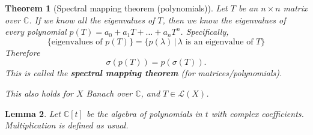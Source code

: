 \documentclass[justified]{tufte-book}
\theoremstyle{plain}%
\newtheorem{thm}{Theorem}[chapter]
\newtheorem{lem}[thm]{Lemma}
\theoremstyle{definition}
\theoremstyle{remark}
\newcommand{\given}{ \, | \,}
\renewcommand{\C}{\mathbb{C}}
\begin{document}
\begin{thm}[Spectral mapping theorem (polynomials)]
  Let $T$ be an $n \times n$ matrix over $\C$.  If we know all the eigenvalues of $T$, then we know the eigenvalues of every polynomial $p(T) = a_0 + a_1 T + \dots + a_n T^n$.  Specifically, \[
      \{ \text{eigenvalues of $p(T)$} \} = \{ p(\lambda) \given \text{$\lambda$ is an eigenvalue of $T$} \}
  \] Therefore \[
      \sigma(p(T)) = p(\sigma(T)).
  \]  This is called the \textbf{spectral mapping theorem} (for matrices/polynomials). 
  
  This also holds for $X$ Banach over $\C$, and $T \in \mathcal L(X)$.
\end{thm}

\begin{lem}
  Let $\C[t]$ be the algebra of polynomials in $t$ with complex coefficients.  Multiplication is defined as usual.
\end{lem}
\end{document}
